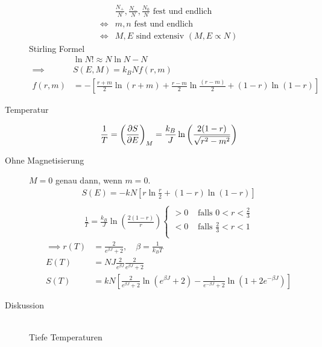 \begin{description}
    \begin{align*}
      & \frac{N_+}{N}, \frac{N_-}{N}, \frac{N_0}{N} \text{ fest und endlich } \\
      \iff & m,n \text{ fest und endlich} \\
      \iff & M,E \text{ sind extensiv } (M,E \propto N)
    \end{align*}
    Stirling Formel \begin{align*}
      & \ln{N!} \approx N \ln{N} - N \\
      \implies & S(E, M) = k_B N f(r, m) \\
      f(r, m ) & = - \left[ \frac{r+m}{2} \ln{(r+m)} + \frac{r - m}{2}
    \ln{\frac{(r - m)}{2}} + (1-r) \ln{(1 - r)} \right]
    \end{align*}
  \item[Temperatur]
    \begin{align*}
      \frac{1}{T} = \left( \frac{\partial S }{\partial E}  \right)_M = \frac{k_B}{J} 
      \ln{\left( \frac{2 (1-r)}{ \sqrt{r^2 - m^2}} \right)}
    \end{align*}
  \item[Ohne Magnetisierung] $M=0$ genau dann, wenn $m=0$.
    \begin{align*}
      S(E) = - k N [ r \ln{\frac{r}{2}} + (1-r) \ln{(1-r)}] \\
    \end{align*}
    \begin{align*}
      \frac{1}{T} = \frac{k_B}{ J } \ln{\left( \frac{2 ( 1-r)}{r} \right) }
       \begin{cases}
         > 0 & \text{ falls } 0 < r < \frac{2}{3} \\
         < 0 & \text{ falls }\frac{2}{3} < r < 1 \\
      \end{cases}
    \end{align*}
    \begin{align*}
      \implies  r (T) &= \frac{2}{e^{\beta J }+2 }, \quad  \beta= \frac{1}{k_B T} \\
                E(T)  &= NJ \frac{2}{e^{\beta J}} \frac{2}{e^{\beta J} + 2} \\
                S(T)  &= k N \left[ \frac{2}{e^{\beta J} + 2} \ln{(e^{\beta J} + 2)}
    - \frac{1}{e^{-\beta J} + 2} \ln{ \left( 1+ 2 e^{-\beta J} \right) }\right]
    \end{align*}
  \item[Diskussion] $ $  \\
    Tiefe Temperaturen \begin{align*}

\end{align*}
\end{description}
